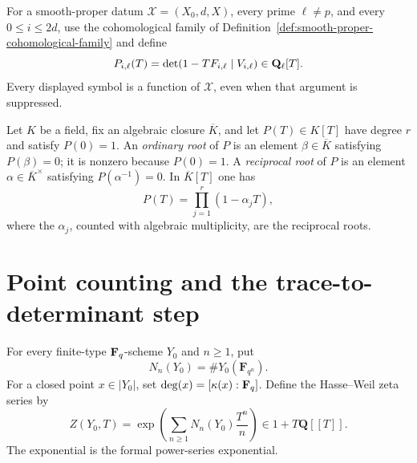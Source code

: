 
\begin{definition}
\label{def:frobenius-characteristic-factors}


For a smooth-proper datum \(\mathscr X=(X_0,d,X)\), every prime
\(\ell\neq p\), and every \(0\leq i\leq2d\), use the cohomological family
of Definition~\ref{def:smooth-proper-cohomological-family} and define
\[
 P_{i,\ell}(T)=
 \det(1-TF_{i,\ell}\mid V_{i,\ell})\in\mathbf Q_{\ell}[T].
\]
Every displayed symbol is a function of \(\mathscr X\), even when that
argument is suppressed.
\end{definition}


\begin{definition}
\label{def:ordinary-reciprocal-roots}


Let \(K\) be a field, fix an algebraic closure \(\overline K\), and let
\(P(T)\in K[T]\) have degree \(r\) and satisfy \(P(0)=1\).  An
\emph{ordinary root} of \(P\) is an element
\(\beta\in\overline K\) satisfying \(P(\beta)=0\); it is nonzero because
\(P(0)=1\).  A \emph{reciprocal root} of \(P\) is an element
\(\alpha\in\overline K^\times\) satisfying \(P(\alpha^{-1})=0\).  In
\(\overline K[T]\) one has
\[
 P(T)=\prod_{j=1}^{r}(1-\alpha_jT),
\]
where the \(\alpha_j\), counted with algebraic multiplicity, are the
reciprocal roots.
\end{definition}


\section{Point counting and the trace-to-determinant step}

\begin{definition}
\label{def:point-count-zeta}
\leanok


For every finite-type \(\mathbf F_q\)-scheme \(Y_0\) and \(n\geq1\), put
\[
 N_n(Y_0)=\#Y_0(\mathbf F_{q^n}).
\]
For a closed point \(x\in|Y_0|\), set
\(\deg(x)=[\kappa(x):\mathbf F_q]\).  Define the Hasse--Weil zeta series by
\[
 Z(Y_0,T)=
 \exp\left(\sum_{n\geq1}N_n(Y_0)\frac{T^n}{n}\right)
 \in1+T\mathbf Q[[T]].
\]
The exponential is the formal power-series exponential.
\end{definition}

